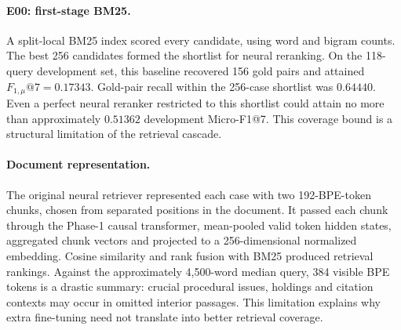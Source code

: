 \paragraph{E00: first-stage BM25.}
A split-local BM25 index scored every candidate, using word and bigram counts.
The best 256 candidates formed the shortlist for neural reranking. On the
118-query development set, this baseline recovered 156 gold pairs and attained
$F_{1,\mu}@7=0.17343$. Gold-pair recall within the 256-case shortlist was
$0.64440$. Even a perfect neural reranker restricted to this shortlist could
attain no more than approximately $0.51362$ development Micro-F1@7. This
coverage bound is a structural limitation of the retrieval cascade.

\paragraph{Document representation.}
The original neural retriever represented each case with two 192-BPE-token
chunks, chosen from separated positions in the document. It passed each chunk
through the Phase-1 causal transformer, mean-pooled valid token hidden states,
aggregated chunk vectors and projected to a 256-dimensional normalized embedding.
Cosine similarity and rank fusion with BM25 produced retrieval rankings.
Against the approximately 4,500-word median query, 384 visible BPE tokens
is a drastic summary: crucial procedural issues, holdings and citation contexts
may occur in omitted interior passages. This limitation explains why extra
fine-tuning need not translate into better retrieval coverage.

